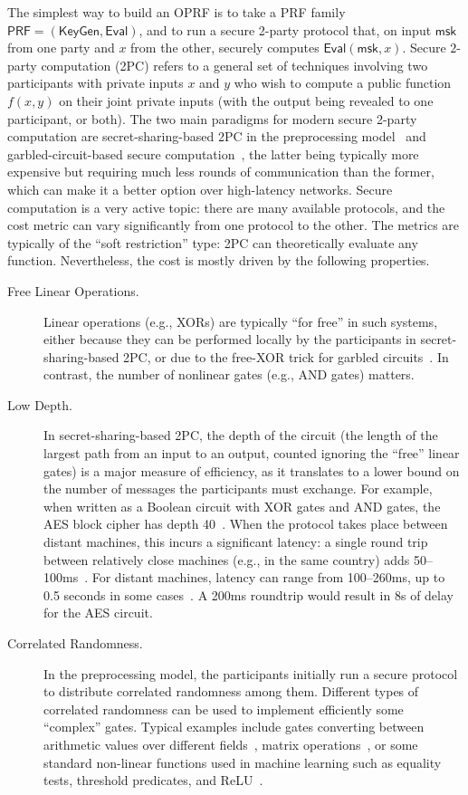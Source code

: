 \documentclass[journal=tosc,submission]{iacrtrans}
\theoremstyle{theorem}
\newcommand\PRF{\ensuremath{\mathsf{PRF}}\xspace}
\newcommand\msk{\ensuremath{\mathsf{msk}}\xspace}
\newcommand\KeyGen{\ensuremath{\mathsf{KeyGen}}\xspace}
\newcommand\Eval{\ensuremath{\mathsf{Eval}}\xspace}
\newcommand\aes{\textsf{AES}}
\begin{document}
The simplest way to build an OPRF is to take a PRF family $\PRF = (\KeyGen, \Eval)$, and to run a secure 2-party protocol that, on input $\msk$ from one party and $x$ from the other, securely computes $\Eval(\msk,x)$. Secure $2$-party computation (2PC) refers to a general set of techniques involving two participants with private inputs $x$ and $y$ who wish to compute a public function $f(x,y)$ on their joint private inputs (with the output being revealed to one participant, or both). The two main paradigms for modern secure 2-party computation are secret-sharing-based 2PC in the preprocessing model~\cite{STOC:GolMicWig87,AC:FKOS15,CCS:KelOrsSch16,C:DPSZ12,EC:KelPasRot18} and garbled-circuit-based secure computation~\cite{FOCS:Yao86,ICALP:KolSch08,EC:ZahRosEva15,CCS:WanRanKat17b,CCS:WanRanKat17a,C:DILO22,EC:CWYY23}, the latter being typically more expensive but requiring much less rounds of communication than the former, which can make it a better option over high-latency networks. Secure computation is a very active topic: there are many available protocols, and the cost metric can vary significantly from one protocol to the other. The metrics are typically of the ``soft restriction'' type: 2PC can theoretically evaluate any function. Nevertheless, the cost is mostly driven by the following properties.
\begin{description}
\item[Free Linear Operations.] Linear operations (e.g., XORs) are typically ``for free'' in such systems, either because they can be performed locally by the participants in secret-sharing-based 2PC, or due to the free-XOR trick for garbled circuits~\cite{ICALP:KolSch08}. In contrast, the number of nonlinear gates (e.g., AND gates) matters.
\item[Low Depth.] In secret-sharing-based 2PC, the depth of the circuit (the length of the largest path from an input to an output, counted ignoring the ``free'' linear gates) is a major measure of efficiency, as it translates to a lower bound on the number of messages the participants must exchange. For example, when written as a Boolean circuit with XOR gates and AND gates, the \aes{} block cipher has depth 40~\cite{EC:ARSTZ15}. When the protocol takes place between distant machines, this incurs a significant latency: a single round trip between relatively close machines (e.g., in the same country) adds 50–100ms~\cite{SP:DKLS19}. For distant machines, latency can range from 100–260ms, up to 0.5 seconds in some cases~\cite{SP:DKLS19}. A 200ms roundtrip would result in 8s of delay for the \aes{} circuit.
\item[Correlated Randomness.] In the preprocessing model, the participants initially run a secure protocol to distribute correlated randomness among them. Different types of correlated randomness can be used to implement efficiently some ``complex'' gates. Typical examples include gates converting between arithmetic values over different fields~\cite{TCC:BIPSW18}, matrix operations~\cite{C:BCGIKS20}, or some standard non-linear functions used in machine learning such as equality tests, threshold predicates, and ReLU~\cite{TCC:BoyGilIsh19,EC:BCGGIK21}.
\end{description}
\end{document}

